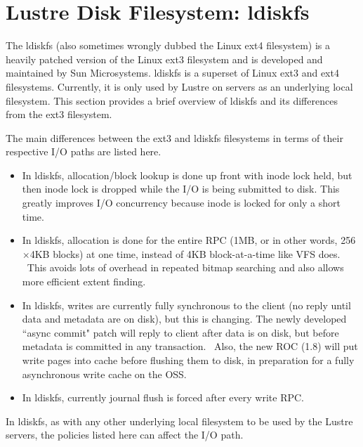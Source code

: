 \section{Lustre Disk Filesystem: ldiskfs}

The ldiskfs (also sometimes wrongly dubbed the Linux ext4 filesystem) is a
heavily patched version of the Linux ext3 filesystem and is developed and
maintained by Sun Microsystems. ldiskfs is a superset of Linux
ext3 and ext4 filesystems. Currently, it is only used by Lustre on servers
as an underlying local filesystem. This section provides a brief overview
of ldiskfs and its differences from the ext3 filesystem.

The main differences between the ext3 and ldiskfs filesystems in terms of their
respective I/O paths are listed here. 

\begin{itemize}

\item In ldiskfs, allocation/block lookup is done up front with inode lock
held, but then inode lock is dropped while the I/O is being submitted to disk.
This greatly improves I/O concurrency because inode is locked for only a short
time.

\item In ldiskfs, allocation is done for the entire RPC (1MB, or in other
words, 256$\times$4KB blocks) at one time, instead of 4KB block-at-a-time like VFS
does.  This avoids lots of overhead in repeated bitmap searching and also
allows more efficient extent finding.

\item In ldiskfs, writes are currently fully synchronous to the client (no
reply until data and metadata are on disk), but this is changing. The newly
developed ``async commit" patch will reply to client after data is on disk, but
before metadata is committed in any transaction.  Also, the new ROC (1.8) will
put write pages into cache before flushing them to disk, in preparation for a
fully asynchronous write cache on the OSS.

\item In ldiskfs, currently journal flush is forced after every write RPC.

\end{itemize}

In ldiskfs, as with any other underlying local filesystem to be used by
the Lustre servers, the policies listed here can affect the I/O path.

